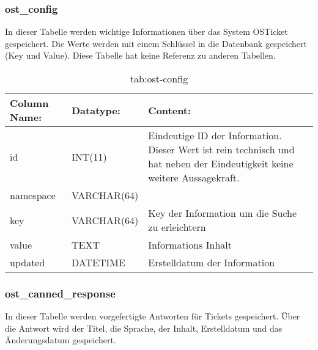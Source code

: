 \newpage

\subsubsection{ost\_config}

In dieser Tabelle werden wichtige Informationen über das System OSTicket gespeichert. Die Werte werden mit einem Schlüssel in die Datenbank gespeichert (Key und Value).
Diese Tabelle hat keine Referenz zu anderen Tabellen.

\begin{table}[h]
	\begin{tabular}{|p{3.5cm}|p{4cm}|p{6.2cm}|}
		\hline
		\textbf{Column Name:} & \textbf{Datatype:} & \textbf{Content:}\\
		\hline
		id & INT(11) & Eindeutige ID der Information. Dieser Wert ist rein technisch und hat  neben der Eindeutigkeit keine weitere 
		Aussagekraft. \\
		\hline
		namespace & VARCHAR(64) & \\
		\hline
		key & VARCHAR(64) & Key der Information um die Suche zu erleichtern\\
		\hline
		value & TEXT & Informations Inhalt\\
		\hline
		updated & DATETIME & Erstelldatum der Information\\
		\hline
	\end{tabular}
	\caption{tab:ost-config}
\end{table}
\label{tab:ost_config}
\newpage


\subsubsection{ost\_canned\_response}

In dieser Tabelle werden vorgefertigte Antworten für Tickets gespeichert. Über die Antwort wird der Titel, die Sprache, der Inhalt, Erstelldatum und das Änderungsdatum gespeichert.

